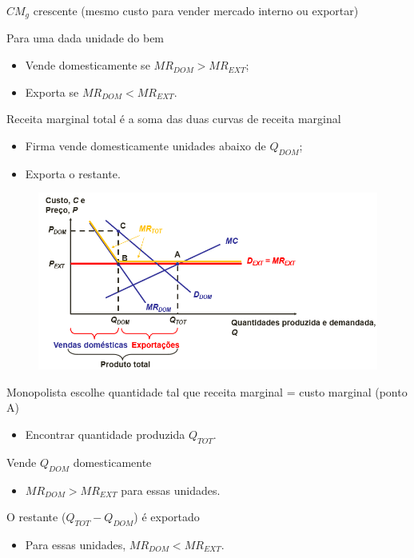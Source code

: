 \documentclass[a4paper,12pt]{article}[abntex2]
\begin{document}
\(CM_g\) crescente (mesmo custo para vender mercado interno ou exportar)

Para uma dada unidade do bem
\begin{itemize}
    \item Vende domesticamente se \( MR_{DOM} > MR_{EXT} \);
    \item Exporta se \( MR_{DOM} < MR_{EXT} \).
\end{itemize}

Receita marginal total é a soma das duas curvas de receita marginal
\begin{itemize}
    \item Firma vende domesticamente unidades abaixo de \( Q_{DOM} \);
    \item Exporta o restante.
\end{itemize}

\begin{figure}[H]
    \centering
    \includegraphics[width=0.9\linewidth]{Imagens/a18i1.png}
\end{figure}

Monopolista escolhe quantidade tal que receita marginal = custo marginal (ponto A)
\begin{itemize}
    \item Encontrar quantidade produzida \( Q_{TOT} \).
\end{itemize}

Vende \( Q_{DOM} \) domesticamente
\begin{itemize}
    \item \( MR_{DOM} > MR_{EXT} \) para essas unidades.
\end{itemize}

O restante (\( Q_{TOT} - Q_{DOM} \)) é exportado
\begin{itemize}
    \item Para essas unidades, \( MR_{DOM} < MR_{EXT} \).
\end{itemize}
\end{document}
